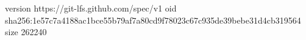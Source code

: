 version https://git-lfs.github.com/spec/v1
oid sha256:1e57c7a4188ac1bce55b79af7a80cd9f78023c67c935de39bebe31d4cb319564
size 262240
